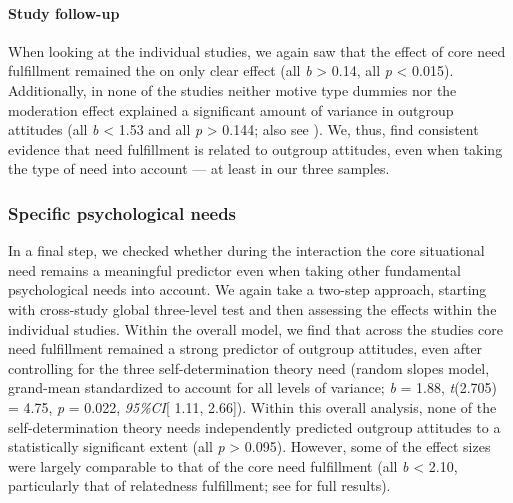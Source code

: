 \paragraph{Study follow-up}

When looking at the individual studies, we again saw that the effect of
core need fulfillment remained the on only clear effect (all
\textbar{}\textit{b}\textbar{} \textgreater{} 0.14, all \textit{p}
\textless{} 0.015). Additionally, in none of the studies neither motive
type dummies nor the moderation effect explained a significant amount of
variance in outgroup attitudes (all \textbar{}\textit{b}\textbar{}
\textless{} 1.53 and all \textit{p} \textgreater{} 0.144; also see
). We, thus, find consistent evidence that
need fulfillment is related to outgroup attitudes, even when taking the
type of need into account --- at least in our three samples.

\subsubsection{Specific psychological needs}

In a final step, we checked whether during the interaction the core
situational need remains a meaningful predictor even when taking other
fundamental psychological needs into account. We again take a two-step
approach, starting with cross-study global three-level test and then
assessing the effects within the individual studies. Within the overall
model, we find that across the studies core need fulfillment remained a
strong predictor of outgroup attitudes, even after controlling for the
three self-determination theory need (random slopes model, grand-mean
standardized to account for all levels of variance; \textit{b} = 1.88,
\textit{t}(2.705) = 4.75, \textit{p} = 0.022, \textit{95\%CI}{[} 1.11,
2.66{]}). Within this overall analysis, none of the self-determination
theory needs independently predicted outgroup attitudes to a
statistically significant extent (all \textit{p} \textgreater{} 0.095).
However, some of the effect sizes were largely comparable to that of the
core need fulfillment (all \textbar{}\textit{b}\textbar{} \textless{}
2.10, particularly that of relatedness fulfillment; see
 for full results).

